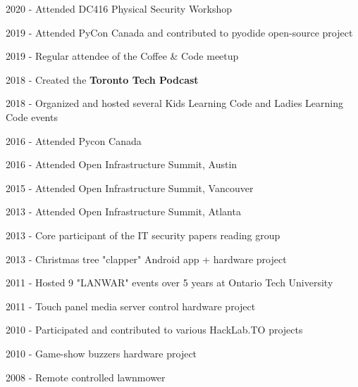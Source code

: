 \documentclass[margin,line]{resume}
\begin{document}
\begin{resume}
    \begin{list2}
        \item 2020 - Attended DC416 Physical Security Workshop
        \item 2019 - Attended PyCon Canada and contributed to pyodide open-source project
        \item 2019 - Regular attendee of the Coffee \& Code meetup
        \item 2018 - Created the \textbf{Toronto Tech Podcast}
        \item 2018 - Organized and hosted several Kids Learning Code and Ladies Learning Code events
        \item 2016 - Attended Pycon Canada
        \item 2016 - Attended Open Infrastructure Summit, Austin
        \item 2015 - Attended Open Infrastructure Summit, Vancouver
        \item 2013 - Attended Open Infrastructure Summit, Atlanta
        \item 2013 - Core participant of the IT security papers reading group
        \item 2013 - Christmas tree "clapper" Android app + hardware project
        \item 2011 - Hosted 9 "LANWAR" events over 5 years at Ontario Tech University
        \item 2011 - Touch panel media server control hardware project
        \item 2010 - Participated and contributed to various HackLab.TO projects
        \item 2010 - Game-show buzzers hardware project
        \item 2008 - Remote controlled lawnmower
    \end{list2}\vspace{-1.5mm}


\end{resume}
\end{document}
